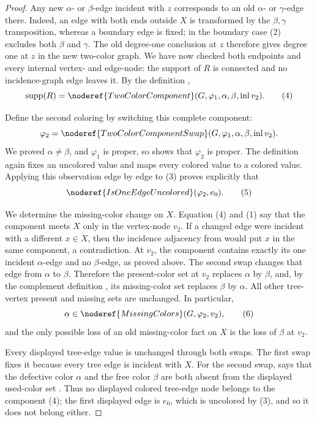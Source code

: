 \begin{proof}
Any new $\alpha$- or $\beta$-edge incident with $z$ corresponds to an old
$\alpha$- or $\gamma$-edge there.  Indeed, an edge with both ends outside
$X$ is transformed by the $\beta,\gamma$ transposition, whereas a boundary
edge is fixed; in the boundary case (2) excludes both $\beta$ and
$\gamma$.  The old degree-one conclusion at $z$ therefore gives degree
one at $z$ in the new two-color graph.  We have now checked both endpoints
and every internal vertex- and edge-node: the support of $R$ is connected
and no incidence-graph edge leaves it.  By the definition
,
\[
 \operatorname{supp}(R)=
 \noderef{TwoColorComponent}
   (G,\varphi_1,\alpha,\beta,\operatorname{inl}v_2).             \tag{4}
\]

Define the second coloring by switching this complete component:
\[
 \varphi_2=
 \noderef{TwoColorComponentSwap}
   (G,\varphi_1,\alpha,\beta,\operatorname{inl}v_2).
\]
We proved $\alpha\ne\beta$, and $\varphi_1$ is proper, so
 shows that $\varphi_2$ is proper.
The definition  again fixes an uncolored
value and maps every colored value to a colored value.  Applying this
observation edge by edge to (3) proves explicitly that
\[
 \noderef{IsOneEdgeUncolored}(\varphi_2,e_0).                    \tag{5}
\]

We determine the missing-color change on $X$.  Equation (4) and (1) say
that the component meets $X$ only in the vertex-node $v_2$.  If a changed
edge were incident with a different $x\in X$, then the incidence
adjacency from  would put $x$ in the same
component, a contradiction.  At $v_2$, the component contains exactly its
one incident $\alpha$-edge and no $\beta$-edge, as proved above.  The
second swap changes that edge from $\alpha$ to $\beta$.  Therefore the
present-color set at $v_2$ replaces $\alpha$ by $\beta$, and, by the
complement definition , its missing-color set
replaces $\beta$ by $\alpha$.  All other tree-vertex present and missing
sets are unchanged.  In particular,
\[
 \alpha\in\noderef{MissingColors}(G,\varphi_2,v_2),              \tag{6}
\]
and the only possible loss of an old missing-color fact on $X$ is the
loss of $\beta$ at $v_2$.

Every displayed tree-edge value is unchanged through both swaps.  The
first swap fixes it because every tree edge is incident with $X$.  For the
second swap,  says that the defective
color $\alpha$ and the free color $\beta$ are both absent from the
displayed used-color set .  Thus no displayed
colored tree-edge node belongs to the component (4); the first displayed
edge is $e_0$, which is uncolored by (3), and so it does not belong either.


\end{proof}
